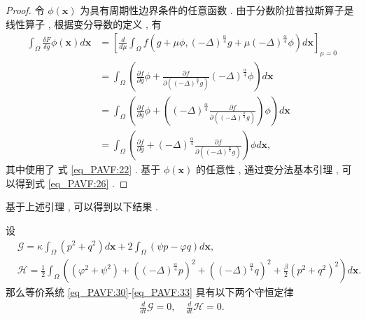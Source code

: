 \begin{proof}
	令 $\phi(\boldsymbol{x})$ 为具有周期性边界条件的任意函数 . 由于分数阶拉普拉斯算子是线性算子 , 根据变分导数的定义 , 有
\begin{equation}
\begin{aligned}
\int_{\Omega} \frac{\delta F}{\delta g} \phi(\boldsymbol{x}) d \boldsymbol{x} &=\left[\frac{d}{d \mu} \int_{\Omega} f\left(g+\mu \phi , (-\Delta)^{\frac{\alpha}{4}} g+\mu(-\Delta)^{\frac{\alpha}{4}} \phi\right) d \boldsymbol{x}\right]_{\mu=0} \\
&=\int_{\Omega}\left(\frac{\partial f}{\partial g} \phi+\frac{\partial f}{\partial\left((-\Delta)^{\frac{\alpha}{4}} g\right)}(-\Delta)^{\frac{\alpha}{4}} \phi\right) d \boldsymbol{x}\\
&=\int_{\Omega}\left(\frac{\partial f}{\partial g} \phi+\left((-\Delta)^{\frac{\alpha}{4}} \frac{\partial f}{\partial\left((-\Delta)^{\frac{\alpha}{4}} g\right)}\right) \phi\right) d \boldsymbol{x} \\
&=\int_{\Omega}\left(\frac{\partial f}{\partial g}+(-\Delta)^{\frac{\alpha}{4}} \frac{\partial f}{\partial\left((-\Delta)^{\frac{\alpha}{4}} g\right)}\right) \phi d \boldsymbol{x} , 
\end{aligned}
\label{eq_27}\end{equation}
其中使用了 式 \eqref{eq_PAVF:22} . 基于 $\phi(\boldsymbol{x})$ 的任意性 , 通过变分法基本引理 , 可以得到式 \eqref{eq_PAVF:26} . 

\end{proof}

基于上述引理 , 可以得到以下结果 . 

\begin{theorem}	\label{thm_PAVF:2_1}
设
\begin{align}
&\mathcal{G}=\kappa \int_{\Omega}\left(p^2+q^2\right) d \boldsymbol{x}+2 \int_{\Omega}(\psi p -\varphi q) d \boldsymbol{x}, \label{eq_PAVF:34} \\
&\mathcal{H}=\frac{1}{2}\int_{\Omega}\left((\varphi^2+\psi^2)+\left((-\Delta)^{\frac{\alpha}{4}} p\right)^{2}+\left((-\Delta)^{\frac{\alpha}{4}} q\right)^{2}+\frac{\beta}{2}(p^2+q^2)^{2}\right) d \boldsymbol{x} . \label{eq_PAVF:35}
\end{align}
那么等价系统 \eqref{eq_PAVF:30}-\eqref{eq_PAVF:33} 具有以下两个守恒定律
\begin{align}
\frac{d}{d t} \mathcal{G}=0 , \quad \frac{d}{d t} \mathcal{H}=0 . 
\end{align}
\end{theorem}

